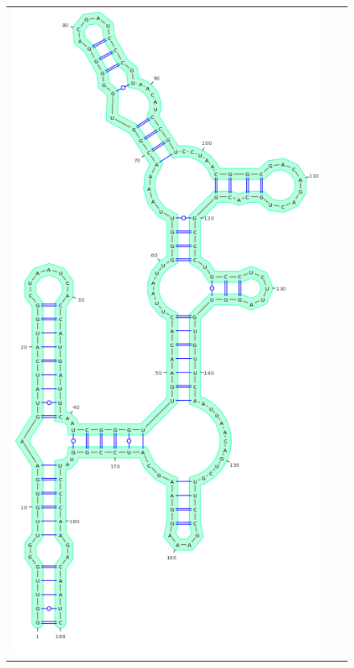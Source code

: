 \documentclass[11pt]{article} %
\begin{document}
\begin{figure}[H]
{\begin{adjustbox}{max width=\textwidth,max height=\textheight,keepaspectratio}
\begin{tabular}{@{}ccc@{}}
 \includegraphics[scale=\MyScale]{graphs/Supp_structures/1M7ILU_NMIAMg}& 

\end{tabular}
\end{adjustbox}}
\end{figure}
\end{document}
